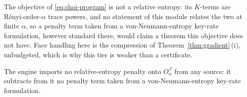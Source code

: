 
The objective of \eqref{eq:choi-program} is not a relative entropy: its
$K$-terms are R\'enyi-order-$\alpha$ trace powers, and no statement of this
module relates the two at finite $\alpha$, so a penalty term taken from a
von-Neumann-entropy key-rate formulation, however standard there, would
claim a theorem this objective does not have. Face handling here is the compression of
Theorem~\ref{thm:gradient}\,(i), unbudgeted, which is why this tier is weaker
than a certificate.

\begin{requirement}\label{req:no-imported-penalty}
The engine imports no relative-entropy penalty onto $O^{J}_{\alpha}$ from any
source: it subtracts from it no penalty term taken from a
von-Neumann-entropy key-rate formulation.
\end{requirement}
